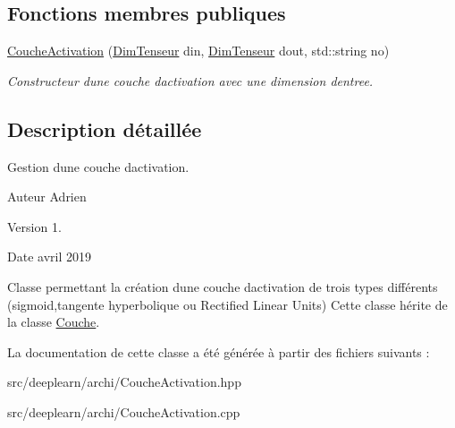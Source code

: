 \subsection*{Fonctions membres publiques}
\begin{DoxyCompactItemize}
\item 
\mbox{\label{classCoucheActivation_a7ac67e43f62ade7fbf4652a64e7281e4}} 
\hyperlink{classCoucheActivation_a7ac67e43f62ade7fbf4652a64e7281e4}{Couche\+Activation} (\hyperlink{classDimTenseur}{Dim\+Tenseur} din, \hyperlink{classDimTenseur}{Dim\+Tenseur} dout, std\+::string no)
\begin{DoxyCompactList}\small\item\em Constructeur d\textquotesingle{}une couche d\textquotesingle{}activation avec une dimension d\textquotesingle{}entree. \end{DoxyCompactList}\end{DoxyCompactItemize}


\subsection{Description détaillée}
Gestion d\textquotesingle{}une couche d\textquotesingle{}activation. 

\begin{DoxyAuthor}{Auteur}
Adrien 
\end{DoxyAuthor}
\begin{DoxyVersion}{Version}
1. 
\end{DoxyVersion}
\begin{DoxyDate}{Date}
avril 2019
\end{DoxyDate}
Classe permettant la création d\textquotesingle{}une couche d\textquotesingle{}activation de trois types différents (sigmoid,tangente hyperbolique ou Rectified Linear Units) Cette classe hérite de la classe \hyperlink{classCouche}{Couche}. 

La documentation de cette classe a été générée à partir des fichiers suivants \+:\begin{DoxyCompactItemize}
\item 
src/deeplearn/archi/Couche\+Activation.\+hpp\item 
src/deeplearn/archi/Couche\+Activation.\+cpp\end{DoxyCompactItemize}
